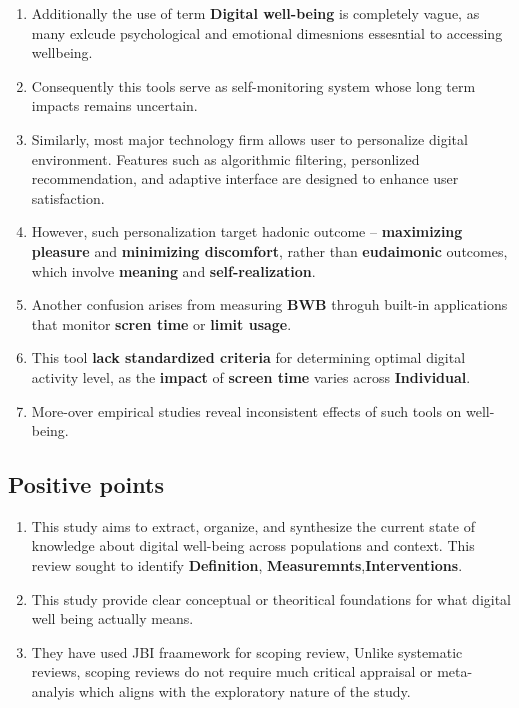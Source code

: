 \documentclass[12pt]{article}
\begin{document}
\begin{enumerate}
    \item Additionally the use of term \textbf{Digital well-being} is completely vague, as many exlcude psychological and emotional dimesnions essesntial to accessing wellbeing.
    \item Consequently this tools serve as self-monitoring system whose long term impacts remains uncertain.
    \item Similarly, most major technology firm allows user to personalize digital environment. Features such as algorithmic filtering, personlized recommendation, and adaptive interface are designed to enhance user satisfaction.
    \item However, such personalization target hadonic outcome -- \textbf{maximizing pleasure} and \textbf{minimizing discomfort},
    rather than \textbf{eudaimonic} outcomes, which involve \textbf{meaning} and \textbf{self-realization}.
    \item Another confusion arises from measuring \textbf{BWB} throguh built-in applications that monitor \textbf{scren time} or \textbf{limit usage}.
    \item This tool \textbf{lack standardized criteria} for determining optimal digital activity level, as the \textbf{impact} of \textbf{screen time} varies across \textbf{Individual}.
    \item More-over empirical studies reveal inconsistent effects of such tools on well-being. 
    

\end{enumerate}
\subsection{Positive points}
\begin{enumerate}
    \item This study aims to extract, organize, and synthesize the current state of knowledge about digital well-being across populations and context. This review sought to identify \textbf{Definition}, \textbf{Measuremnts},\textbf{Interventions}.
    \item This study provide clear conceptual or theoritical foundations for what digital well being actually means.
    \item They have used JBI fraamework for scoping review, Unlike systematic reviews, scoping reviews do not require much critical appraisal or meta-analyis which aligns with the exploratory nature of the study.

\end{enumerate}
\end{document}
